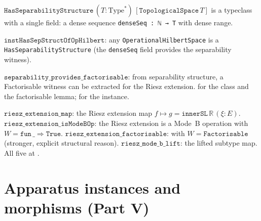 \begin{definition}
\label{def:HasSeparabilityStructure}
\leanok
{}
$\texttt{HasSeparabilityStructure}\,(T : \mathrm{Type}^*)\,
[\texttt{TopologicalSpace}\,T]$ is a typeclass with a single field:
a dense sequence \texttt{denseSeq : ℕ → T} with dense range.

$\texttt{instHasSepStructOfOpHilbert}$: any \texttt{OperationalHilbertSpace}
is a \texttt{HasSeparabilityStructure} (the \texttt{denseSeq} field provides
the separability witness).

$\texttt{separability\_provides\_factorisable}$: from separability structure,
a Factorisable witness can be extracted for the Riesz extension.
\axiomprofile{[]} for the class and the factorisable lemma;
 for the instance.
\end{definition}

\begin{theorem}
\label{thm:riesz_mode_b}
\leanok
{}
$\texttt{riesz\_extension\_map}$: the Riesz extension map
$f \mapsto g = \texttt{innerSL}\,\mathbb{R}\,(\xi : E)$.
$\texttt{riesz\_extension\_isModeBOp}$: the Riesz extension is a Mode~B
operation with $W = \texttt{fun}\,\_ \Rightarrow \texttt{True}$.
$\texttt{riesz\_extension\_factorisable}$: with $W = \texttt{Factorisable}$
(stronger, explicit structural reason).
$\texttt{riesz\_mode\_b\_lift}$: the lifted subtype map.
All five at .
\end{theorem}

\section{Apparatus instances and morphisms (Part V)}
\label{sec:apparatus_instances}

